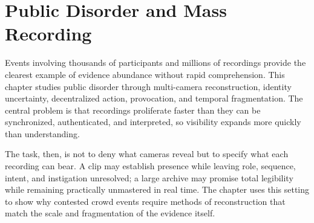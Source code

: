 
\chapter{Public Disorder and Mass Recording}
\label{ch:ch084}

Events involving thousands of participants and millions of recordings provide the clearest example of evidence abundance without rapid comprehension. This chapter studies public disorder through multi-camera reconstruction, identity uncertainty, decentralized action, provocation, and temporal fragmentation. The central problem is that recordings proliferate faster than they can be synchronized, authenticated, and interpreted, so visibility expands more quickly than understanding.

The task, then, is not to deny what cameras reveal but to specify what each recording can bear. A clip may establish presence while leaving role, sequence, intent, and instigation unresolved; a large archive may promise total legibility while remaining practically unmastered in real time. The chapter uses this setting to show why contested crowd events require methods of reconstruction that match the scale and fragmentation of the evidence itself.
